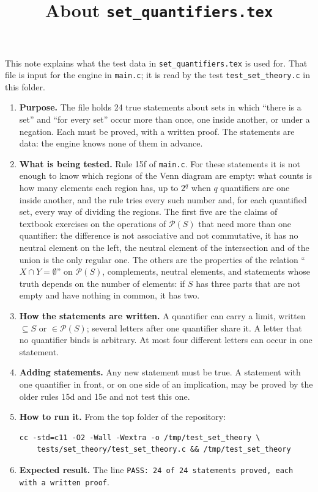 \documentclass[11pt,a4paper]{article}
\title{About \texttt{set\_quantifiers.tex}}
\author{}
\date{}
\begin{document}
\maketitle
This note explains what the test data in \texttt{set\_quantifiers.tex} is used for. That file is input for the engine in \texttt{main.c}; it is read by the test \texttt{test\_set\_theory.c} in this folder.

\begin{enumerate}
\item \textbf{Purpose.} The file holds 24 true statements about sets in which ``there is a set'' and ``for every set'' occur more than once, one inside another, or under a negation. Each must be proved, with a written proof. The statements are data: the engine knows none of them in advance.

\item \textbf{What is being tested.} Rule 15f of \texttt{main.c}. For these statements it is not enough to know which regions of the Venn diagram are empty: what counts is how many elements each region has, up to $2^{q}$ when $q$ quantifiers are one inside another, and the rule tries every such number and, for each quantified set, every way of dividing the regions. The first five are the claims of textbook exercises on the operations of $\mathcal{P}(S)$ that need more than one quantifier: the difference is not associative and not commutative, it has no neutral element on the left, the neutral element of the intersection and of the union is the only regular one. The others are the properties of the relation ``$X \cap Y = \emptyset$'' on $\mathcal{P}(S)$, complements, neutral elements, and statements whose truth depends on the number of elements: if $S$ has three parts that are not empty and have nothing in common, it has two.

\item \textbf{How the statements are written.} A quantifier can carry a limit, written $\subseteq S$ or $\in \mathcal{P}(S)$; several letters after one quantifier share it. A letter that no quantifier binds is arbitrary. At most four different letters can occur in one statement.

\item \textbf{Adding statements.} Any new statement must be true. A statement with one quantifier in front, or on one side of an implication, may be proved by the older rules 15d and 15e and not test this one.

\item \textbf{How to run it.} From the top folder of the repository:
\begin{verbatim}
cc -std=c11 -O2 -Wall -Wextra -o /tmp/test_set_theory \
    tests/set_theory/test_set_theory.c && /tmp/test_set_theory
\end{verbatim}

\item \textbf{Expected result.} The line \texttt{PASS: 24 of 24 statements proved, each with a written proof}.
\end{enumerate}
\end{document}
